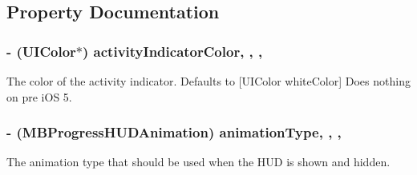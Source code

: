 \subsection{Property Documentation}
\hypertarget{interface_m_b_progress_h_u_d_a39469370af56b4ee74cde5b471b3a9b0}{
\subsubsection[{activity\+Indicator\+Color}]{\setlength{\rightskip}{0pt plus 5cm}-\/ (U\+I\+Color$\ast$) activity\+Indicator\+Color\hspace{0.3cm}{\ttfamily [read]}, {\ttfamily [write]}, {\ttfamily [atomic]}, {\ttfamily [assign]}}}\label{interface_m_b_progress_h_u_d_a39469370af56b4ee74cde5b471b3a9b0}
The color of the activity indicator. Defaults to \mbox{[}U\+I\+Color white\+Color\mbox{]} Does nothing on pre i\+O\+S 5. \hypertarget{interface_m_b_progress_h_u_d_a71d04bb9e2839df9377ad10d03b2e468}{
\subsubsection[{animation\+Type}]{\setlength{\rightskip}{0pt plus 5cm}-\/ (M\+B\+Progress\+H\+U\+D\+Animation) animation\+Type\hspace{0.3cm}{\ttfamily [read]}, {\ttfamily [write]}, {\ttfamily [atomic]}, {\ttfamily [assign]}}}\label{interface_m_b_progress_h_u_d_a71d04bb9e2839df9377ad10d03b2e468}
The animation type that should be used when the H\+U\+D is shown and hidden.

